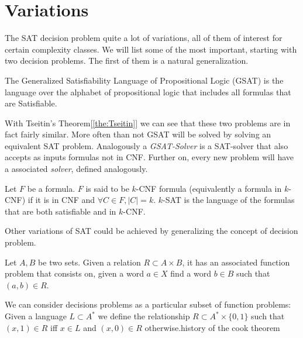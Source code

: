 \section{Variations}

The SAT decision problem quite a lot of variations, all of them of interest for certain complexity classes. We will list some of the most important, starting with two decision problems. The first of them is a natural generalization.

\begin{definition}
  The Generalized Satisfiability Language of Propositional Logic (GSAT) is the language over the alphabet of propositional logic that includes all formulas that are Satisfiable.
\end{definition}

With Tseitin's Theorem[\ref{the:Tseitin}] we can see that these two problems are in fact fairly similar. More often than not GSAT will be solved by solving an equivalent SAT problem. Analogously a \emph{GSAT-Solver}  is a SAT-solver that also accepts as inputs formulas not in CNF. Further on, every new problem will have a associated \emph{solver}, defined analogously.



\begin{definition}
  Let $F$ be a formula. $F$ is said to be $k$-CNF formula (equivalently a formula in $k$-CNF) if it is in CNF and $\forall C \in F, |C| = k$. $k$-SAT is the language of the formulas that are both satisfiable and in $k$-CNF.
\end{definition}

Other variations of SAT could be achieved by generalizing the concept of decision problem.

\begin{definition}
  Let $A,B$ be two sets. Given a relation $R\subset A\times B$, it has an associated function problem that consists on, given a word $a\in X$ find a word $b\in B$ such that $(a,b)\in R$.
\end{definition}

We can consider decisions problems as a particular subset of function problems: Given a language $L\subset A^*$ we define the relationship $R\subset A^*\times \{0,1\}$ such that $(x,1)\in R$ iff $x\in L$ and $(x,0)\in R$ otherwise.history of the cook theorem   

